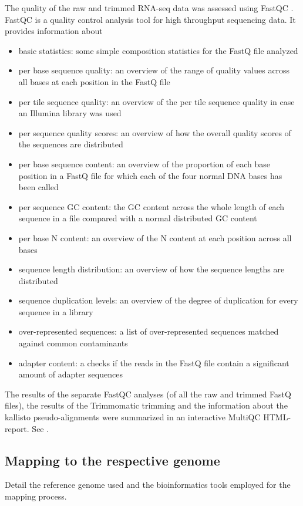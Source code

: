 The quality of the raw and trimmed RNA-seq data was assessed using FastQC \autocite{babraham}. FastQC is a quality control analysis tool for high throughput sequencing data. It provides information about
\begin{itemize}
    \item basic statistics: some simple composition statistics for the FastQ file analyzed
    \item per base sequence quality: an overview of the range of quality values across all bases at each position in the FastQ file
    \item per tile sequence quality: an overview of the per tile sequence quality in case an Illumina library was used
    \item per sequence quality scores: an overview of how the overall quality scores of the sequences are distributed
    \item per base sequence content: an overview of the proportion of each base position in a FastQ file for which each of the four normal DNA bases has been called
    \item per sequence GC content: the GC content across the whole length of each sequence in a file compared with a normal distributed GC content
    \item per base N content: an overview of the N content at each position across all bases
    \item sequence length distribution: an overview of how the sequence lengths are distributed
    \item sequence duplication levels: an overview of the degree of duplication for every sequence in a library
    \item over-represented sequences: a list of over-represented sequences matched against common contaminants
    \item adapter content: a checks if the reads in the FastQ file contain a significant amount of adapter sequences
\end{itemize}

The results of the separate FastQC analyses (of all the raw and trimmed FastQ files), the results of the Trimmomatic trimming and the information about the kallisto pseudo-alignments were summarized in an interactive MultiQC HTML-report. See \autocite{10.1093/bioinformatics/btw354}.


\subsection{Mapping to the respective genome}
Detail the reference genome used and the bioinformatics tools employed for the mapping process.

